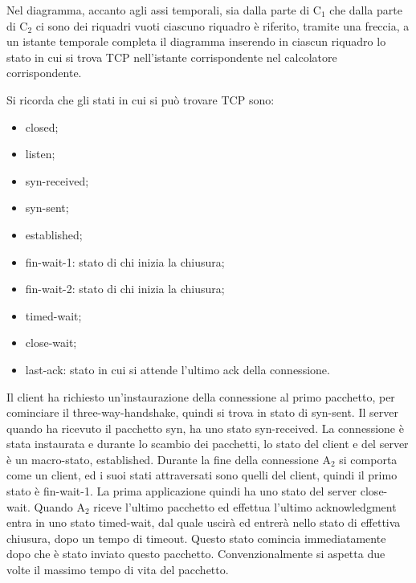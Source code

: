 \documentclass{article}
\numberwithin{equation}{subsection}
\begin{document}
Nel diagramma, accanto agli assi temporali, sia dalla parte di C$_1$ che dalla parte di C$_2$ ci sono dei riquadri vuoti ciascuno riquadro è riferito, tramite una freccia, 
a un istante temporale completa il diagramma inserendo in ciascun riquadro lo stato in cui si trova TCP nell'istante corrispondente nel calcolatore corrispondente. 

Si ricorda che gli stati in cui si può trovare TCP sono:
\begin{itemize}
    \item closed;
    \item listen;
    \item syn-received;
    \item syn-sent;
    \item established;
    \item fin-wait-1: stato di chi inizia la chiusura;
    \item fin-wait-2: stato di chi inizia la chiusura;
    \item timed-wait;
    \item close-wait;
    \item last-ack: stato in cui si attende l'ultimo ack della connessione.
\end{itemize}

Il client ha richiesto un'instaurazione della connessione al primo pacchetto, per cominciare il three-way-handshake, quindi si trova in stato di syn-sent. Il server 
quando ha ricevuto il pacchetto syn, ha uno stato syn-received. 
La connessione è stata instaurata e durante lo scambio dei pacchetti, lo stato del client e del server è un macro-stato, established. 
Durante la fine della connessione A$_2$ si comporta come un client, ed i suoi stati attraversati sono quelli del client, quindi il primo stato è fin-wait-1. La prima 
applicazione quindi ha uno stato del server close-wait. 
Quando A$_2$ riceve l'ultimo pacchetto ed effettua l'ultimo acknowledgment entra in uno stato timed-wait, dal quale uscirà ed entrerà nello stato di effettiva chiusura, 
dopo un tempo di timeout. Questo stato comincia immediatamente dopo che è stato inviato questo pacchetto. Convenzionalmente si aspetta due volte il massimo tempo di vita 
del pacchetto. 
\end{document}
